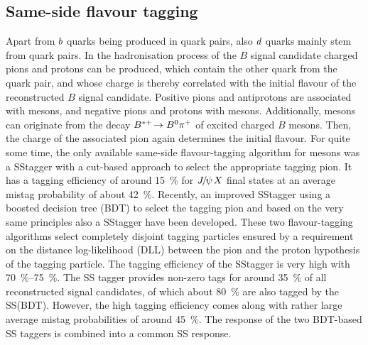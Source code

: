 
\subsection{Same-side flavour tagging}
\label{sec:detecor:tagging:sstagger}

Apart from ${b}$ quarks being produced in \bbbar quark pairs, also
${d}$ quarks mainly stem from \ddbar quark pairs. In the hadronisation
process of the $B$ signal candidate charged pions and protons can be produced,
which contain the other quark from the \ddbar quark pair, and whose charge is
thereby correlated with the initial flavour of the reconstructed $B$ signal
candidate. Positive pions and antiprotons are associated with \Bz mesons, and
negative pions and protons with \Bzb mesons. Additionally, \Bd mesons can
originate from the decay $B^{*+}\!\rightarrow{\ensuremath{{B}^0}}{\ensuremath{{\pi}^+}}$ of excited charged $B$ mesons.
Then, the charge of the associated pion again determines the initial flavour.
For quite some time, the only available same-side flavour-tagging algorithm for
\Bz mesons was a SS\pion tagger with a cut-based approach to select the
appropriate tagging pion. It has a tagging efficiency of around
\SI{15}{\percent} for ${{J\mskip -3mu/\mskip -2mu\psi\mskip 2mu}}X$ final states at an average mistag probability
of about \SI{42}{\percent}. Recently, an improved SS\pion tagger using a
boosted decision tree (BDT) to select the tagging pion and based on the very
same principles also a SS\proton tagger have been
developed\cite{CERN-THESIS-2015-040,LHCb-PAPER-2016-039}. These two
flavour-tagging algorithms select completely disjoint tagging particles
ensured by a requirement on the distance log-likelihood (DLL) between the pion
and the proton hypothesis of the tagging particle. The tagging efficiency of
the SS\pion tagger is very high with \SIrange{70}{75}{\percent}. The SS\proton
tagger provides non-zero tags for around \SI{35}{\percent} of all
reconstructed signal candidates, of which about \SI{80}{\percent} are also
tagged by the SS\pion (BDT). However, the high tagging efficiency comes along
with rather large average mistag probabilities of around \SI{45}{\percent}.
The response of the two BDT-based SS taggers is combined into a common SS
response.